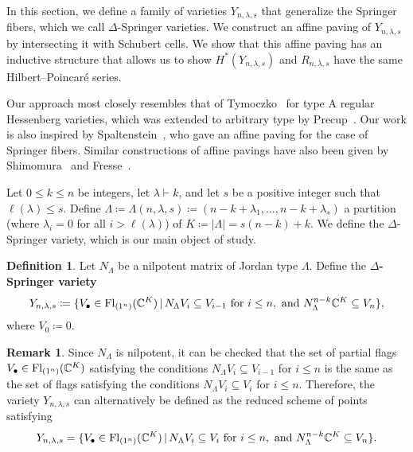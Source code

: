 \documentclass[11pt]{amsart}
\theoremstyle{definition}
\newtheorem{definition}[theorem]{Definition}
\newtheorem{remark}[theorem]{Remark}
\newcommand{\st}{\,|\,}
\newcommand{\Fl}{\mathrm{Fl}}
\newcommand{\la}{\lambda}
\begin{document}
In this section, we define a family of varieties $Y_{n,\lambda,s}$ that generalize the Springer fibers, which we call $\Delta$-Springer varieties. We construct an affine paving of $Y_{n,\lambda,s}$ by intersecting it with Schubert cells.
We show that this affine paving has an inductive structure that allows us to show $H^*(Y_{n,\lambda,s})$ and $R_{n,\lambda,s}$ have the same Hilbert--Poincar\'e series.

Our approach most closely resembles that of Tymoczko~\cite{Tymoczko-LinearConditions} for type A regular Hessenberg varieties, which was extended to arbitrary type by Precup~\cite{Precup-AffinePavings}. Our work is also inspired by  Spaltenstein~\cite[Chapitre II, Proposition 5.9]{Spaltenstein-book}, who gave an affine paving for the case of Springer fibers.  Similar constructions of affine pavings have also been given by Shimomura~\cite{Shimomura} and Fresse~\cite{Fresse}.  

Let $0\leq k\leq n$ be integers, let $\la\vdash k$, and let $s$ be a positive integer such that $\ell(\lambda) \leq s$. Define $\Lambda \coloneqq \Lambda(n,\lambda,s) \coloneqq (n-k+\lambda_1,\ldots,n-k+\lambda_s)$ a partition (where $\la_i=0$ for all $i>\ell(\la)$) of $K\coloneqq |\Lambda|=s(n-k)+k$. We define the $\Delta$-Springer variety, which is our main object of study.
\begin{definition}
Let $N_\Lambda$ be a nilpotent matrix of Jordan type $\Lambda$. Define the \textbf{$\Delta$-Springer variety}
\begin{align}
    Y_{n,\la,s}\coloneqq \{V_\bullet \in \Fl_{(1^n)}(\bC^K)\st N_\Lambda V_i\subseteq V_{i-1}\text{ for }i\leq n,\text{ and }N_\Lambda^{n-k}\bC^K\subseteq V_n\},
\end{align}
where $V_0\coloneqq 0$.
\end{definition}



\begin{remark}
Since $N_\Lambda$ is nilpotent, it can be checked that the set of partial flags $V_\bullet\in \Fl_{(1^n)}(\bC^K)$ satisfying the conditions $N_\Lambda V_i\subseteq V_{i-1}$ for $i\leq n$ is the same as the set of flags satisfying the conditions $N_\Lambda V_i\subseteq V_{i}$ for $i\leq n$. Therefore, the variety $Y_{n,\la,s}$ can alternatively be defined as the reduced scheme of points satisfying
\begin{align}
    Y_{n,\la,s} = \{V_\bullet \in \Fl_{(1^n)}(\bC^K) \st N_\Lambda V_i\subseteq V_{i} \text{ for }i\leq n,\text{ and }N_\Lambda^{n-k}\bC^K\subseteq V_n\}.
\end{align}
\end{remark}
\end{document}
